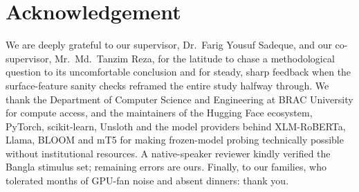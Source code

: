 \section*{Acknowledgement}

We are deeply grateful to our supervisor, Dr.~Farig Yousuf Sadeque, and our co-supervisor, Mr.~Md.~Tanzim Reza, for the latitude to chase a methodological question to its uncomfortable conclusion and for steady, sharp feedback when the surface-feature sanity checks reframed the entire study halfway through. We thank the Department of Computer Science and Engineering at BRAC University for compute access, and the maintainers of the Hugging Face ecosystem, PyTorch, scikit-learn, Unsloth and the model providers behind XLM-RoBERTa, Llama, BLOOM and mT5 for making frozen-model probing technically possible without institutional resources. A native-speaker reviewer kindly verified the Bangla stimulus set; remaining errors are ours. Finally, to our families, who tolerated months of GPU-fan noise and absent dinners: thank you.

\pagebreak
